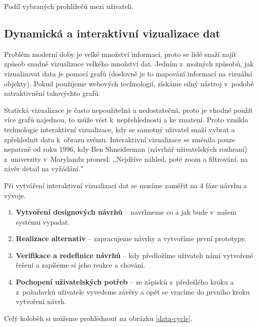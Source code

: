 \begin{graph}[H]
\centering
{}
\caption{Podíl vybraných prohlížečů mezi uživateli.}
\label{browser-share}
\end{graph}
\subsection{Dynamická a interaktivní vizualizace dat}
\par Problém moderní doby je velké množství informací, proto se lidé snaží najít způsob snadné vizualizace velkého množství dat. Jedním z~možných způsobů, jak vizualizovat data je pomocí grafů (doslovně je to mapování informací na vizuální objekty). Pokud použijeme webových technologií, získáme silný nástroj v~podobě zatraktivnění takovýchto grafů. \cite{interactive-data-reily}

\par Statická vizualizace je často nepoužitelná a nedostatečná, proto je vhodné použít více grafů najednou, to může vést k~nepřehlednosti a ke zmatení. Proto vznikla technologie interaktivní vizualizace, kdy se samotný uživatel snaží vybrat a zpřehlednit data k~obrazu svému. Interaktivní vizualizace se změnila pouze nepatrně od roku 1996, kdy Ben Shneiderman (návrhář uživatelských rozhraní) z~univerzity v~Marylandu pronesl: ,,Nejdříve náhled, poté zoom a filtrování, na závěr detail na vyžádání."\cite{interactive-data-reily}

\par Při vytváření interaktivní vizualizaci dat se musíme zaměřit na 4 fáze návrhu a vývoje.
\begin{enumerate}
\item \textbf{Vytvoření designových návrhů} -- navrhneme co a jak bude v~našem systému vypadat.
\item \textbf{Realizace alternativ} -- zapracujeme návrhy a vytvoříme první prototypy.
\item \textbf{Verifikace a redefinice návrhů} -- kdy předložíme uživateli námi vytvořené řešení a zapíšeme si jeho reakce a chování.
\item \textbf{Pochopení uživatelských potřeb} -- ze zápisků z~předešlého kroku a z~požadavků uživatele vyvedeme závěry a opět se vracíme do prvního kroku vytvoření návrh. \cite{the-ux-book}
\end{enumerate}
 Celý koloběh si můžeme prohlédnout na obrázku \ref{data-cycle}.


